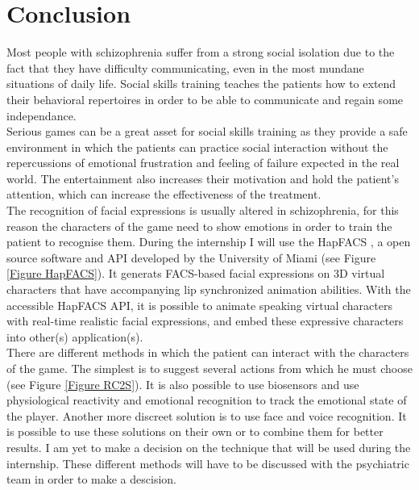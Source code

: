 \documentclass[11pt]{article}
\begin{document}
\section{Conclusion}
Most people with schizophrenia suffer from a strong social isolation due to the fact that they have difficulty communicating, even in the most mundane situations of daily life. Social skills training teaches the patients how to extend their behavioral repertoires in order to be able to communicate and regain some independance.\\

Serious games can be a great asset for social skills training as they provide a safe environment in which the patients can practice social interaction without the repercussions of emotional frustration and feeling of failure expected in the real world. The entertainment also increases their motivation and hold the patient's attention, which can increase the effectiveness of the treatment. \\

The recognition of facial expressions is usually altered in schizophrenia, for this reason the characters of the game need to show emotions in order to train the patient to recognise them. During the internship I will use the HapFACS \cite{Amini13}, a open source software and API developed by the University of Miami (see Figure \ref{Figure HapFACS}). It generats FACS-based facial expressions on 3D virtual characters that have accompanying lip synchronized animation abilities. With the accessible HapFACS API, it is possible to animate speaking virtual characters with real-time realistic facial expressions, and embed these expressive characters into other(s) application(s). \\

There are different methods in which the patient can interact with the characters of the game. The simplest is to suggest several actions from which he must choose (see Figure \ref{Figure RC2S}). It is also possible to use biosensors and use physiological reactivity and emotional recognition to track the emotional state of the player. Another more discreet solution is to use face and voice recognition. It is possible to use these solutions on their own or to combine them for better results. I am yet to make a decision on the technique that will be used during the internship. These different methods will have to be discussed with the psychiatric team in order to make a descision. \\
\end{document}
